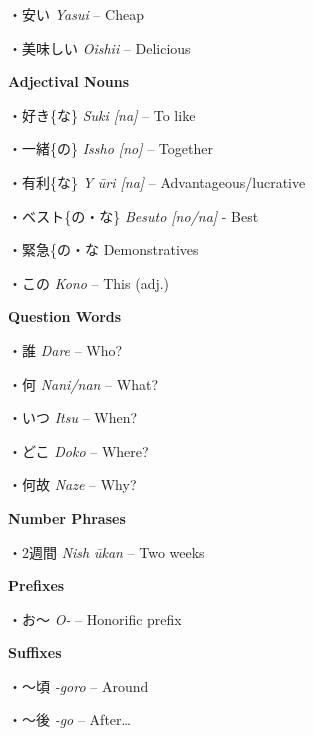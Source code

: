 \par{・安い \emph{Yasui }– Cheap }

\par{・美味しい \emph{Oishii }– Delicious }

\par{\textbf{Adjectival Nouns }}

\par{・好き\{な\} \emph{Suki [na] }– To like }

\par{・一緒\{の\} \emph{Issho [no] }– Together }

\par{・有利\{な\} \emph{Y }\emph{ūri [na] }– Advantageous\slash lucrative }

\par{・ベスト\{の・な\} \emph{Besuto [no\slash na] }- Best }

\par{・緊急\{の・な Demonstratives }

\par{・この \emph{Kono }– This (adj.) }

\par{\textbf{Question Words }}

\par{・誰 \emph{Dare }– Who? }

\par{・何 \emph{Nani\slash nan }– What? }

\par{・いつ \emph{Itsu }– When? }

\par{・どこ \emph{Doko }– Where? }

\par{・何故 \emph{Naze }– Why? }

\par{\textbf{Number Phrases }}

\par{・2週間 \emph{Nish }\emph{ūkan }– Two weeks }

\par{\textbf{Prefixes }}

\par{・お～ \emph{O- }– Honorific prefix }

\par{\textbf{Suffixes }}

\par{・～頃 \emph{-goro }– Around }

\par{・～後 \emph{-go }– After… }

